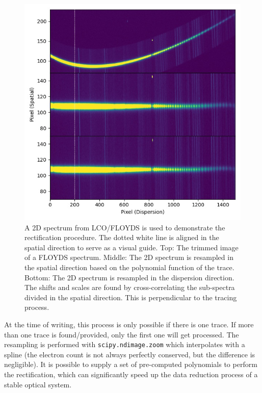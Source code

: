 \documentclass[fleqn,usenatbib]{mnras}
\begin{document}
\begin{figure}
    \centering
    \includegraphics[width=\columnwidth]{fig_02_rectification.jpg}
    \caption{A 2D spectrum from LCO/FLOYDS is used to
    demonstrate the rectification procedure. The dotted white line
    is aligned in the spatial direction to serve as a visual guide.
    Top: The trimmed image of a FLOYDS spectrum. Middle: The 2D
    spectrum is resampled in the spatial direction based on the
    polynomial function of the trace. Bottom: The 2D spectrum is
    resampled in the dispersion direction. The shifts and scales
    are found by cross-correlating the sub-spectra divided in the
    spatial direction. This is perpendicular to the tracing process.}
    \label{fig:rectify}
\end{figure}

At the time of writing, this process is only possible if there is
one trace. If more than one trace is found/provided, only the first
one will get processed. The resampling is performed with
\texttt{scipy.ndimage.zoom} which interpolates with a spline (the
electron count is not always perfectly conserved, but the difference
is negligible). It is possible to supply a set of pre-computed polynomials to perform
the rectification, which can significantly speed up the data reduction
process of a stable optical system.
\end{document}
